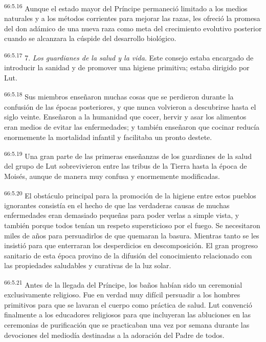 \par
\textsuperscript{66:5.16} Aunque el estado mayor del Príncipe permaneció limitado a los medios naturales y a los métodos corrientes para mejorar las razas, les ofreció la promesa del don adámico de una nueva raza como meta del crecimiento evolutivo posterior cuando se alcanzara la cúspide del desarrollo biológico.

\par
\textsuperscript{66:5.17} 7. \textit{Los guardianes de la salud y la vida}. Este consejo estaba encargado de introducir la sanidad y de promover una higiene primitiva; estaba dirigido por Lut.

\par
\textsuperscript{66:5.18} Sus miembros enseñaron muchas cosas que se perdieron durante la confusión de las épocas posteriores, y que nunca volvieron a descubrirse hasta el siglo veinte. Enseñaron a la humanidad que cocer, hervir y asar los alimentos eran medios de evitar las enfermedades; y también enseñaron que cocinar reducía enormemente la mortalidad infantil y facilitaba un pronto destete.

\par
\textsuperscript{66:5.19} Una gran parte de las primeras enseñanzas de los guardianes de la salud del grupo de Lut sobrevivieron entre las tribus de la Tierra hasta la época de Moisés, aunque de manera muy confusa y enormemente modificadas.

\par
\textsuperscript{66:5.20} El obstáculo principal para la promoción de la higiene entre estos pueblos ignorantes consistía en el hecho de que las verdaderas causas de muchas enfermedades eran demasiado pequeñas para poder verlas a simple vista, y también porque todos tenían un respeto supersticioso por el fuego. Se necesitaron miles de años para persuadirlos de que quemaran la basura. Mientras tanto se les insistió para que enterraran los desperdicios en descomposición. El gran progreso sanitario de esta época provino de la difusión del conocimiento relacionado con las propiedades saludables y curativas de la luz solar.

\par
\textsuperscript{66:5.21} Antes de la llegada del Príncipe, los baños habían sido un ceremonial exclusivamente religioso. Fue en verdad muy difícil persuadir a los hombres primitivos para que se lavaran el cuerpo como práctica de salud. Lut convenció finalmente a los educadores religiosos para que incluyeran las abluciones en las ceremonias de purificación que se practicaban una vez por semana durante las devociones del mediodía destinadas a la adoración del Padre de todos.

